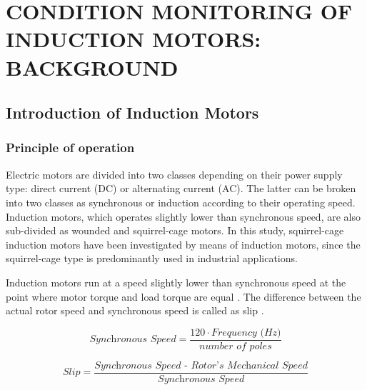 \chapter{CONDITION MONITORING OF INDUCTION MOTORS: BACKGROUND }\label{Ch2}
\vspace*{-12pt} %
\section{Introduction of Induction Motors}
\subsection{Principle of operation}

Electric motors are divided into two classes depending on their power supply type: direct current (DC) or alternating current (AC). The latter can be broken into two classes as synchronous or induction according to their operating speed. Induction motors, which operates slightly lower than synchronous speed, are also sub-divided as wounded and squirrel-cage motors. In this study, squirrel-cage induction motors have been investigated by means of induction motors, since the squirrel-cage type is predominantly used in industrial applications. 

Induction motors run at a speed slightly lower than synchronous speed at the point where motor torque and load torque are equal \cite{gunnar2016}. The difference between the actual rotor speed and synchronous speed is called as slip \cite{doe2008improving}.

\begin{equation}
	\textit{Synchronous Speed} = \displaystyle \frac{120 \cdot \textit{Frequency (Hz)}}{\textit{number of poles}}
	\label{speed}
\end{equation}

\begin{equation}
	\textit{Slip} = \displaystyle \frac{\textit{Synchronous Speed - Rotor's Mechanical Speed}}{\textit{Synchronous Speed}}
	\label{slip}
\end{equation}


